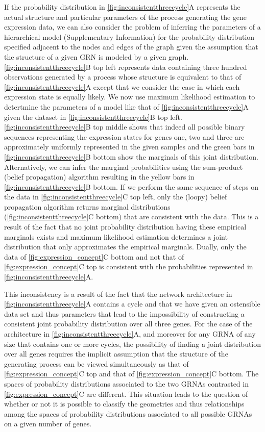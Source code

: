 If the probability distribution in \ref{fig:inconsistentthreecycle}A represents the actual structure and particular parameters of the process generating the gene expression data, we can also consider the problem of inferring the parameters of a hierarchical model (Supplementary Information) for the probability distribution specified adjacent to the nodes and edges of the graph given the assumption that the structure of a given GRN is modeled by a given graph. \ref{fig:inconsistentthreecycle}B top left represents data containing three hundred observations generated by a process whose structure is equivalent to that of \ref{fig:inconsistentthreecycle}A except that we consider the case in which each expression state is equally likely. We now use maximum likelihood estimation \cite{Barber2012} to detertmine the parameters of a model like that of \ref{fig:inconsistentthreecycle}A given the dataset in \ref{fig:inconsistentthreecycle}B top left. \ref{fig:inconsistentthreecycle}B top middle shows that indeed all possible binary sequences representing the expression states for genes one, two and three are approximately uniformly represented in the given samples and the green bars in \ref{fig:inconsistentthreecycle}B bottom show the marginals of this joint distribution. Alternatively, we can infer the marginal probabilities using the sum-product (belief propagation) algorithm \cite{Barber2012} resulting in the yellow bars in \ref{fig:inconsistentthreecycle}B bottom. If we perform the same sequence of steps on the data in \ref{fig:inconsistentthreecycle}C top left, only the (loopy) belief propagation algorithm returns marginal distributions (\ref{fig:inconsistentthreecycle}C bottom) that are consistent with the data. This is a result of the fact that no joint probability distribution having these empirical marginals exists and maximum likelihood estimation determines a joint distribution that only approximates the empirical marginals. Dually, only the data of \ref{fig:expression_concept}C bottom and not that of \ref{fig:expression_concept}C top is consistent with the probabilities represented in \ref{fig:inconsistentthreecycle}A.

This inconsistency is a result of the fact that the network architecture in \ref{fig:inconsistentthreecycle}A contains a cycle \cite{Lauritzen1996,Geiger2006,Wainwright2007} and that we have given an ostensible data set and thus parameters that lead to the impossibility of constructing a consistent joint probability distribution over all three genes. For the case of the architecture in \ref{fig:inconsistentthreecycle}A, and moreover for any GRNA of any size that contains one or more cycles, the possibility of finding a joint distribution over all genes requires the implicit assumption that the structure of the generating process can be viewed simultaneously as that of \ref{fig:expression_concept}C top and that of \ref{fig:expression_concept}C bottom. The spaces of probability distributions associated to the two GRNAs contrasted in \ref{fig:expression_concept}C are different. This situation leads to the question of whether or not it is possible to classify the geometries and thus relationships among the spaces of probability distributions associated to all possible GRNAs on a given number of genes.

